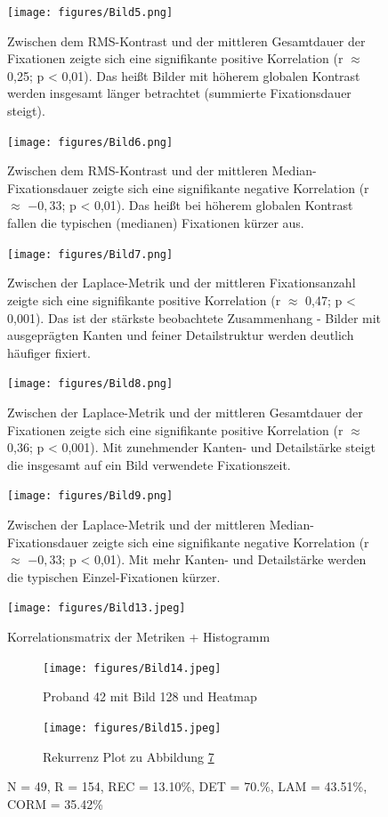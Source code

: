 \documentclass[
    language=german, %
    thesis=seminar, %
    supervisor=postdoc, %
    multiauthor=true, %
    ]{settings/csssa-thesis}
\begin{document}
\begin{figure}[h]
    \centering
    \texttt{[image: figures/Bild5.png]}
    \caption{ Zwischen dem RMS-Kontrast und der mittleren Gesamtdauer der Fixationen zeigte sich eine signifikante positive Korrelation (r $\approx$ 0,25; p < 0,01). Das hei{\ss}t Bilder mit höherem globalen Kontrast werden insgesamt länger betrachtet (summierte Fixationsdauer steigt).
}\label{fig:bild5}
\end{figure}
\begin{figure}[h]
    \centering
    \texttt{[image: figures/Bild6.png]}
    \caption{ Zwischen dem RMS-Kontrast und der mittleren Median-Fixationsdauer zeigte sich eine signifikante negative Korrelation (r $\approx$ $-0,33$; p < 0,01). Das hei{\ss}t bei höherem globalen Kontrast fallen die typischen (medianen) Fixationen kürzer aus.
 }\label{fig:bild6}
\end{figure}
\begin{figure}[h]
    \centering
    \texttt{[image: figures/Bild7.png]}
    \caption{Zwischen der Laplace-Metrik und der mittleren Fixationsanzahl zeigte sich eine signifikante positive Korrelation (r $\approx$ 0,47; p < 0,001). Das ist der stärkste beobachtete Zusammenhang - Bilder mit ausgeprägten Kanten und feiner Detailstruktur werden deutlich häufiger fixiert.
 }\label{fig:bild7}
\end{figure}
\begin{figure}[h]
    \centering
    \texttt{[image: figures/Bild8.png]}
    \caption{Zwischen der Laplace-Metrik und der mittleren Gesamtdauer der Fixationen zeigte sich eine signifikante positive Korrelation (r $\approx$ 0,36; p < 0,001). Mit zunehmender Kanten- und Detailstärke steigt die insgesamt auf ein Bild verwendete Fixationszeit.
 }\label{fig:bild8}
\end{figure}
\begin{figure}[h]
    \centering
    \texttt{[image: figures/Bild9.png]}
    \caption{Zwischen der Laplace-Metrik und der mittleren Median-Fixationsdauer zeigte sich eine signifikante negative Korrelation (r $\approx$ $-0,33$; p < 0,01). Mit mehr Kanten- und Detailstärke werden die typischen Einzel-Fixationen kürzer.
  }\label{fig:bild9}
\end{figure}
\begin{figure}[ht]
    \centering
    \texttt{[image: figures/Bild13.jpeg]}
    \caption{Korrelationsmatrix der Metriken + Histogramm}\label{fig:Bild12}
\end{figure}
\begin{figure}[ht]
    \centering
    \begin{subfigure}{0.49\textwidth}
        \centering
        \texttt{[image: figures/Bild14.jpeg]}
        \caption{Proband 42 mit Bild 128 und Heatmap}\label{fig:Bild13a}
    \end{subfigure}
    \begin{subfigure}{0.49\textwidth}
        \centering
        \texttt{[image: figures/Bild15.jpeg]}
        \caption{Rekurrenz Plot zu Abbildung \ref{fig:Bild13a}}\label{fig:Bild13b}
    \end{subfigure}\label{fig:Bild13}
    \caption{N = 49, R = 154, REC = 13.10\%, DET = 70.\%, LAM = 43.51\%, CORM = 35.42\%}
\end{figure}
\end{document}
